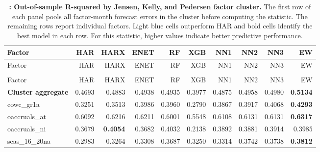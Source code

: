 \begingroup\scriptsize
\captionsetup{justification=raggedright,labelsep=none,singlelinecheck=false,labelformat=boldlabel}
\setlength{\tabcolsep}{2.5pt}
\begin{longtable}{>{\raggedright\arraybackslash}p{2.6cm}rrrrrrrrr}
\caption[Out-of-sample R-squared by Jensen, Kelly, and Pedersen factor cluster.]{\footnotesize \textbf{: Out-of-sample R-squared by Jensen, Kelly, and Pedersen factor cluster.} The first row of each panel pools all factor-month forecast errors in the cluster before computing the statistic. The remaining rows report individual factors. Light blue cells outperform HAR and bold cells identify the best model in each row. For this statistic, higher values indicate better predictive performance.}\label{tab:rv-factor_rss}\\
\hline
Factor & HAR & HARX & ENET & RF & XGB & NN1 & NN2 & NN3 & EW \\
\hline\endfirsthead
\hline
Factor & HAR & HARX & ENET & RF & XGB & NN1 & NN2 & NN3 & EW \\
\hline\endhead
\hline\endfoot
\multicolumn{10}{@{}l}{\textit{Panel A. Accruals}} \\
\hline
Factor & HAR & HARX & ENET & RF & XGB & NN1 & NN2 & NN3 & EW \\
\hline
\textbf{Cluster aggregate} & 0.4693 & \cellcolor{blue!10}0.4883 & \cellcolor{blue!10}0.4938 & \cellcolor{blue!10}0.4935 & 0.3977 & \cellcolor{blue!10}0.4875 & \cellcolor{blue!10}0.4958 & \cellcolor{blue!10}0.4980 & \textbf{\cellcolor{blue!10}0.5134} \\
cowc\_gr1a & 0.3251 & \cellcolor{blue!10}0.3513 & \cellcolor{blue!10}0.3986 & \cellcolor{blue!10}0.3960 & 0.2790 & \cellcolor{blue!10}0.3867 & \cellcolor{blue!10}0.3917 & \cellcolor{blue!10}0.4068 & \textbf{\cellcolor{blue!10}0.4293} \\
oaccruals\_at & 0.6092 & \cellcolor{blue!10}0.6216 & \cellcolor{blue!10}0.6211 & 0.6001 & 0.5548 & \cellcolor{blue!10}0.6108 & \cellcolor{blue!10}0.6131 & \cellcolor{blue!10}0.6131 & \textbf{\cellcolor{blue!10}0.6317} \\
oaccruals\_ni & 0.3679 & \textbf{\cellcolor{blue!10}0.4054} & \cellcolor{blue!10}0.3682 & \cellcolor{blue!10}0.4032 & 0.2138 & \cellcolor{blue!10}0.3892 & \cellcolor{blue!10}0.3881 & \cellcolor{blue!10}0.3914 & \cellcolor{blue!10}0.3985 \\
seas\_16\_20na & 0.2983 & \cellcolor{blue!10}0.3264 & \cellcolor{blue!10}0.3308 & \cellcolor{blue!10}0.3687 & \cellcolor{blue!10}0.3250 & \cellcolor{blue!10}0.3314 & \cellcolor{blue!10}0.3742 & \cellcolor{blue!10}0.3738 & \textbf{\cellcolor{blue!10}0.3812} \\

\end{longtable}
